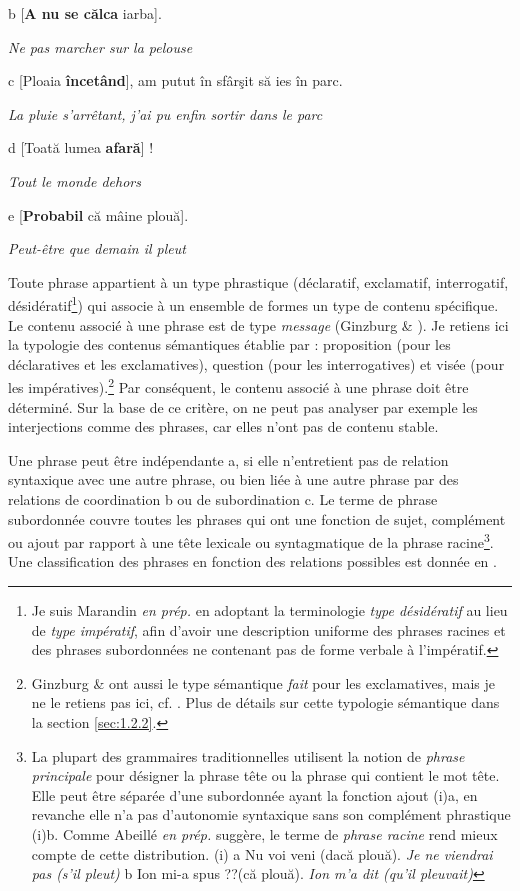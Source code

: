   b  [\textbf{A nu se călca} iarba].

{\itshape
Ne pas marcher sur la pelouse} 

  c  [Ploaia \textbf{încetând}], am putut în sfârşit să ies în parc.

{\itshape
La pluie s'arrêtant, j'ai pu enfin sortir dans le parc}

  d  [Toată lumea \textbf{afară}] !

{\itshape
Tout le monde dehors}

  e  [\textbf{Probabil} că mâine plouă].

    \textit{Peut-être que demain il pleut}

Toute phrase appartient à un type phrastique (déclaratif, exclamatif, interrogatif, désidératif\footnote{Je suis Marandin \textit{en prép.} en adoptant la terminologie \textit{type désidératif} au lieu de \textit{type impératif}, afin d'avoir une description uniforme des phrases racines et des phrases subordonnées ne contenant pas de forme verbale à l'impératif.}) qui associe à un ensemble de formes un type de contenu spécifique. Le contenu associé à une phrase est de type \textit{message} (Ginzburg \& \citet{Sag2000}). Je retiens ici la typologie des contenus sémantiques établie par \citet{Marandin2008} : proposition (pour les déclaratives et les exclamatives), question (pour les interrogatives) et visée (pour les impératives).\footnote{Ginzburg \& \citet{Sag2000} ont aussi le type sémantique \textit{fait} pour les exclamatives, mais je ne le retiens pas ici, cf. \citet{Marandin2008}. Plus de détails sur cette typologie sémantique dans la section \ref{sec:1.2.2}.} Par conséquent, le contenu associé à une phrase doit être déterminé. Sur la base de ce critère, on ne peut pas analyser par exemple les interjections comme des phrases, car elles n'ont pas de contenu stable. 

Une phrase peut être indépendante a, si elle n'entretient pas de relation syntaxique avec une autre phrase, ou bien liée à une autre phrase par des relations de coordination b ou de subordination c. Le terme de phrase subordonnée couvre toutes les phrases qui ont une fonction de sujet, complément ou ajout par rapport à une tête lexicale ou syntagmatique de la phrase racine\footnote{La plupart des grammaires traditionnelles utilisent la notion de \textit{phrase principale} pour désigner la phrase tête ou la phrase qui contient le mot tête. Elle peut être séparée d'une subordonnée ayant la fonction ajout (i)a, en revanche elle n'a pas d'autonomie syntaxique sans son complément phrastique (i)b. Comme Abeillé \textit{en prép.} suggère, le terme de \textit{phrase racine} rend mieux compte de cette distribution.
(i)  a  Nu voi veni (dacă plouă). 
    \textit{Je ne viendrai pas (s'il pleut)}
  b  Ion mi-a spus ??(că plouă).
    \textit{Ion m'a dit (qu'il pleuvait)}}. Une classification des phrases en fonction des relations possibles est donnée en .



